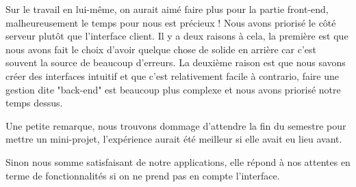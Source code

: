 \documentclass[twoside]{eiaArticle}
\begin{document}
Sur le travail en lui-même, on aurait aimé faire plus pour la partie front-end, malheureusement le temps pour nous est précieux ! Nous avons priorisé le côté serveur plutôt que l'interface client. Il y a deux raisons à cela, la première est que nous avons fait le choix d'avoir quelque chose de solide en arrière car c'est souvent la source de beaucoup d'erreurs. La deuxième raison est que nous savons créer des interfaces intuitif et que c'est relativement facile à contrario, faire une gestion dite "back-end" est beaucoup plus complexe et nous avons priorisé notre temps dessus.

Une petite remarque, nous trouvons dommage d'attendre la fin du semestre pour mettre un mini-projet, l'expérience aurait été meilleur si elle avait eu lieu avant.

Sinon nous somme satisfaisant de notre applications, elle répond à nos attentes en terme de fonctionnalités si on ne prend pas en compte l'interface.
\end{document}
